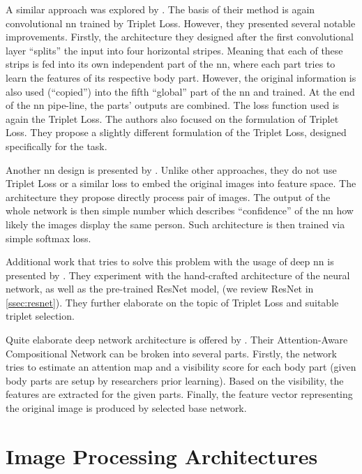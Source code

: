 A similar approach was explored by \cite{cheng2016person}. The basis of their method is again convolutional \gls{nn} trained by Triplet Loss. However, they presented several notable improvements. Firstly, the architecture they designed after the first convolutional layer ``splits'' the input into four horizontal stripes. Meaning that each of these strips is fed into its own independent part of the \gls{nn}, where each part tries to learn the features of its respective body part. However, the original information is also used (``copied'') into the fifth ``global'' part of the \gls{nn} and trained. At the end of the \gls{nn} pipe-line, the parts' outputs are combined. The loss function used is again the Triplet Loss. The authors also focused on the formulation of Triplet Loss. They propose a slightly different formulation of the Triplet Loss, designed specifically for the \reid{} task.

Another \gls{nn} design is presented by \cite{li2014deepreid}. Unlike other approaches, they do not use Triplet Loss or a similar loss to embed the original images into feature space. The architecture they propose directly process pair of images. The output of the whole network is then simple number which describes ``confidence'' of the \gls{nn} how likely the images display the same person. Such architecture is then trained via simple softmax loss.

Additional work that tries to solve this problem with the usage of deep \gls{nn} is presented by \cite{hermans2017defense}. They experiment with the hand-crafted architecture of the neural network, as well as the pre-trained ResNet model, (we review ResNet in \autoref{ssec:resnet}). They further elaborate on the topic of Triplet Loss and suitable triplet selection.

Quite elaborate deep network architecture is offered by \cite{xu2018attention}. Their Attention-Aware Compositional Network can be broken into several parts. Firstly, the network tries to estimate an attention map and a visibility score for each body part (given body parts are setup by researchers prior learning). Based on the visibility, the features are extracted for the given parts.  Finally, the feature vector representing the original image is produced by selected base network.

\section{Image Processing Architectures}

